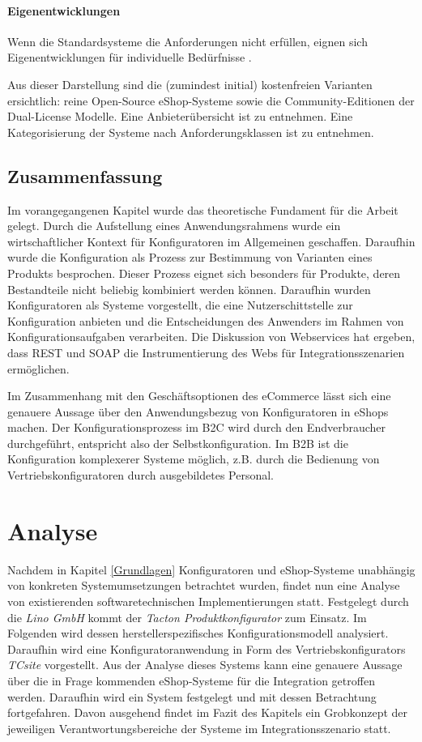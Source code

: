 \documentclass[11pt, a4paper, titlepage, listof=totoc, bibliography=totoc, index=totoc, twoside, openright, headings=normal]{scrreprt}
\begin{document}
\subsubsection*{Eigenentwicklungen}
Wenn die Standardsysteme die Anforderungen nicht erfüllen, eignen sich Eigenentwicklungen für individuelle Bedürfnisse \citep{stahl15, graf14}.

Aus dieser Darstellung sind die (zumindest initial) kostenfreien Varianten ersichtlich: reine Open-Source eShop-Systeme sowie die Community-Editionen der Dual-License Modelle. Eine Anbieterübersicht ist \citet{t3n14} zu entnehmen. Eine Kategorisierung der Systeme nach Anforderungsklassen ist \citet{graf14} zu entnehmen.

\section*{Zusammenfassung}
Im vorangegangenen Kapitel wurde das theoretische Fundament für die Arbeit gelegt. Durch die Aufstellung eines Anwendungsrahmens wurde ein wirtschaftlicher Kontext für Konfiguratoren im Allgemeinen geschaffen. Daraufhin wurde die Konfiguration als Prozess zur Bestimmung von Varianten eines Produkts besprochen. Dieser Prozess eignet sich besonders für Produkte, deren Bestandteile nicht beliebig kombiniert werden können. Daraufhin wurden Konfiguratoren als Systeme vorgestellt, die eine Nutzerschittstelle zur Konfiguration anbieten und die Entscheidungen des Anwenders im Rahmen von Konfigurationsaufgaben verarbeiten. Die Diskussion von Webservices hat ergeben, dass REST und SOAP die Instrumentierung des Webs für Integrationsszenarien ermöglichen.

Im Zusammenhang mit den Geschäftsoptionen des eCommerce lässt sich eine genauere Aussage über den Anwendungsbezug von Konfiguratoren in eShops machen. Der Konfigurationsprozess im B2C wird durch den Endverbraucher durchgeführt, entspricht also der Selbstkonfiguration. Im B2B ist die Konfiguration komplexerer Systeme möglich, z.B. durch die Bedienung von Vertriebskonfiguratoren durch ausgebildetes Personal. 

\chapter{Analyse}
\label{section:Analyse}

Nachdem in Kapitel \ref{Grundlagen} Konfiguratoren und eShop-Systeme unabhängig von konkreten Systemumsetzungen betrachtet wurden, findet nun eine Analyse von existierenden softwaretechnischen Implementierungen statt. Festgelegt durch die \emph{Lino GmbH} kommt der \emph{Tacton Produktkonfigurator} zum Einsatz. Im Folgenden wird dessen herstellerspezifisches Konfigurationsmodell analysiert. Daraufhin wird eine Konfiguratoranwendung in Form des Vertriebskonfigurators \emph{TCsite} vorgestellt. Aus der Analyse dieses Systems kann eine genauere Aussage über die in Frage kommenden eShop-Systeme für die Integration getroffen werden. Daraufhin wird ein System festgelegt und mit dessen Betrachtung fortgefahren. Davon ausgehend findet im Fazit des Kapitels ein Grobkonzept der jeweiligen Verantwortungsbereiche der Systeme im Integrationsszenario statt.
\end{document}
